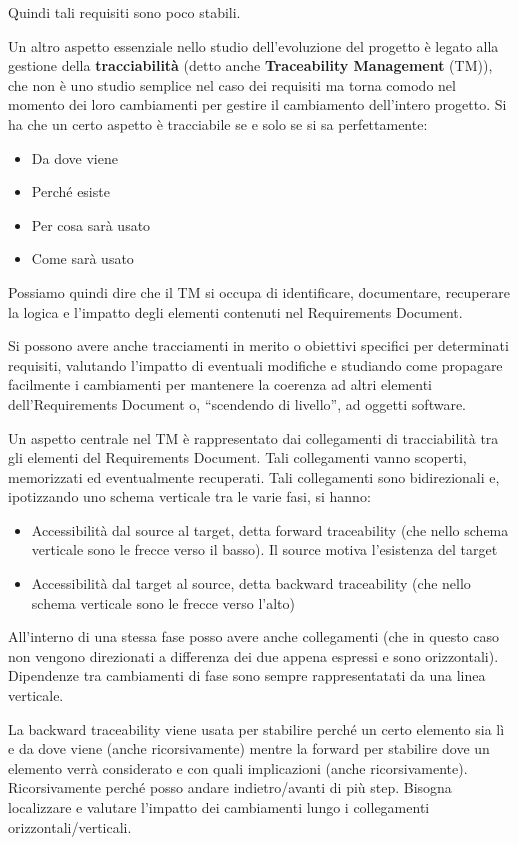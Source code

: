 Quindi tali requisiti sono poco stabili.

Un altro aspetto essenziale nello studio dell'evoluzione del progetto è legato
alla gestione della \textbf{tracciabilità} (detto anche \textbf{Traceability Management}
(TM)), che non è uno studio semplice nel caso dei requisiti ma torna comodo nel
momento dei loro cambiamenti per gestire il cambiamento dell'intero progetto. Si ha
che un certo aspetto è tracciabile se e solo se si sa perfettamente:
\begin{itemize}
    \item Da dove viene
    \item Perché esiste
    \item Per cosa sarà usato
    \item Come sarà usato
\end{itemize}
Possiamo quindi dire che il TM si occupa di identificare, documentare, recuperare
la logica e l'impatto degli elementi contenuti nel Requirements Document.

Si possono avere anche tracciamenti in merito o obiettivi specifici per determinati
requisiti, valutando l'impatto di eventuali modifiche e studiando come propagare
facilmente i cambiamenti per mantenere la coerenza ad altri elementi
dell'Requirements Document o, “scendendo di livello”, ad oggetti software.

Un aspetto centrale nel TM è rappresentato dai collegamenti di tracciabilità tra
gli elementi del Requirements Document. Tali collegamenti vanno scoperti,
memorizzati ed eventualmente recuperati. Tali collegamenti sono bidirezionali e,
ipotizzando uno schema verticale tra le varie fasi, si hanno:
\begin{itemize}
    \item Accessibilità dal source al target, detta forward traceability
          (che nello schema verticale sono le frecce verso il basso). Il source motiva l'esistenza del target
    \item Accessibilità dal target al source, detta backward traceability
          (che nello schema verticale sono le frecce verso l'alto)
\end{itemize}
All'interno di una stessa fase posso avere anche collegamenti (che in questo caso
non vengono direzionati a differenza dei due appena espressi e sono orizzontali).
Dipendenze tra cambiamenti di fase sono sempre rappresentatati da una linea verticale.

La backward traceability viene usata per stabilire perché un certo elemento sia
lì e da dove viene (anche ricorsivamente) mentre la forward per stabilire dove un
elemento verrà considerato e con quali implicazioni (anche ricorsivamente).
Ricorsivamente perché posso andare indietro/avanti di più step. Bisogna localizzare
e valutare l'impatto dei cambiamenti lungo i collegamenti orizzontali/verticali.

